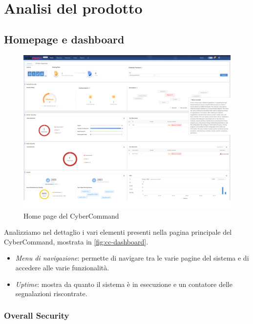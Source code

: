 \chapter{Analisi del prodotto}
\label{cap:prodotto}


\section{Homepage e dashboard}

\begin{figure}[!htbp]
    \centering
    \includegraphics[width=\linewidth]{images/ndr/dashboard.png}
    \caption{Home page del CyberCommand}
    \label{fig:cc-dashboard}
\end{figure}

Analizziamo nel dettaglio i vari elementi presenti nella pagina principale del CyberCommand, mostrata in \autoref{fig:cc-dashboard}.

\begin{itemize}
    \item \emph{Menu di navigazione}: permette di navigare tra le varie pagine del sistema e di accedere alle varie funzionalità.
    \item \emph{Uptime}: mostra da quanto il sistema è in esecuzione e un contatore delle segnalazioni riscontrate.
\end{itemize}

\subsection{Overall Security}

